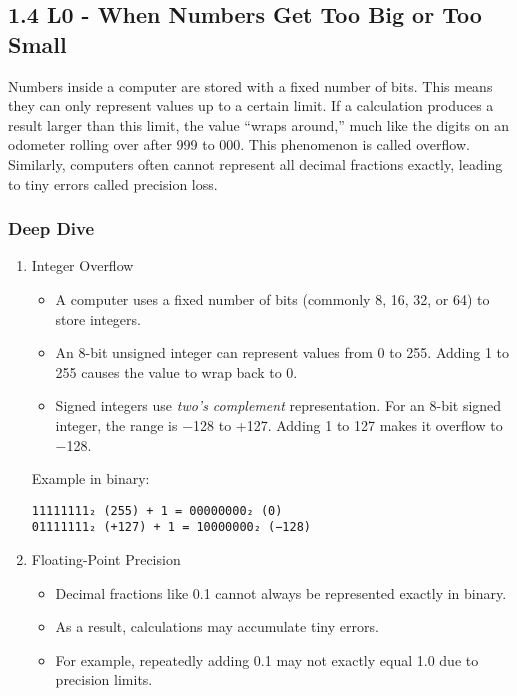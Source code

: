 \documentclass[
  letterpaper,
  DIV=11,
  numbers=noendperiod]{scrreprt}
\providecommand{\tightlist}{%
  \setlength{\itemsep}{0pt}\setlength{\parskip}{0pt}}
\begin{document}
\subsection{1.4 L0 - When Numbers Get Too Big or Too
Small}\label{l0---when-numbers-get-too-big-or-too-small}

Numbers inside a computer are stored with a fixed number of bits. This
means they can only represent values up to a certain limit. If a
calculation produces a result larger than this limit, the value ``wraps
around,'' much like the digits on an odometer rolling over after 999 to
000. This phenomenon is called overflow. Similarly, computers often
cannot represent all decimal fractions exactly, leading to tiny errors
called precision loss.

\subsubsection{Deep Dive}\label{deep-dive}

\begin{enumerate}
\def\labelenumi{\arabic{enumi}.}
\item
  Integer Overflow

  \begin{itemize}
  \tightlist
  \item
    A computer uses a fixed number of bits (commonly 8, 16, 32, or 64)
    to store integers.
  \item
    An 8-bit unsigned integer can represent values from 0 to 255. Adding
    1 to 255 causes the value to wrap back to 0.
  \item
    Signed integers use \emph{two's complement} representation. For an
    8-bit signed integer, the range is −128 to +127. Adding 1 to 127
    makes it overflow to −128.
  \end{itemize}

  Example in binary:

\begin{verbatim}
11111111₂ (255) + 1 = 00000000₂ (0)
01111111₂ (+127) + 1 = 10000000₂ (−128)
\end{verbatim}
\item
  Floating-Point Precision

  \begin{itemize}
  \tightlist
  \item
    Decimal fractions like 0.1 cannot always be represented exactly in
    binary.
  \item
    As a result, calculations may accumulate tiny errors.
  \item
    For example, repeatedly adding 0.1 may not exactly equal 1.0 due to
    precision limits.
  \end{itemize}
\end{enumerate}
\end{document}
